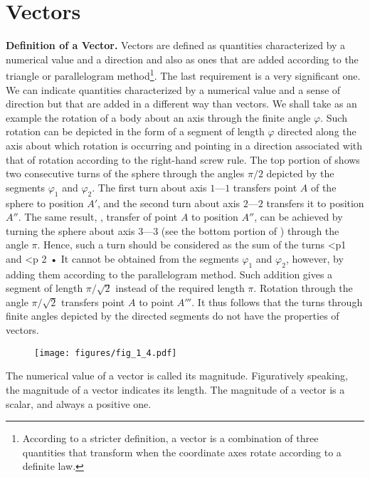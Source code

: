 \section{Vectors}\label{sec:1_2}

\textbf{Definition of a Vector.} Vectors are defined as quantities characterized by a numerical value and a direction and also as ones that are added according to the triangle or parallelogram method\footnote{According to a stricter definition, a vector is a combination of three quantities that transform when the coordinate axes rotate according to a definite law.}. The last requirement is a very significant one. We can indicate quantities characterized by a numerical value and a sense of direction but that are added in a different way than vectors. We shall take as an example the rotation of a body about an axis through the finite angle $\varphi$. Such rotation can be depicted in the form of a segment of length $\varphi$ directed along the axis about which rotation is occurring and pointing in a direction associated with that of rotation according to the right-hand screw rule. The top portion of  shows two consecutive turns of the sphere through the angles $\pi/2$ depicted by the segments $\varphi_1$ and $\varphi_2$. The first turn about axis $1$---$1$ transfers point $A$ of the sphere to position $A'$, and the second turn about axis $2$---$2$ transfers it to position $A''$. The same result, \ie, transfer of point $A$ to position $A''$, can be achieved by turning the sphere about axis $3$---$3$ (see the bottom portion of ) through the angle $\pi$. Hence, such a turn should be considered as the sum of the turns <p1 and <p 2 • It cannot be obtained from the segments $\varphi_1$ and $\varphi_2$, however, by adding them according to the parallelogram method. Such addition gives a segment of length $\pi/\sqrt{2}$ instead of the required length $\pi$. Rotation through the angle $\pi/\sqrt{2}$ transfers point $A$ to point $A'''$. It thus follows that the turns through finite angles depicted by the directed segments do not have the properties of vectors.

\begin{figure}[t]
	\begin{center}
		\texttt{[image: figures/fig\_1\_4.pdf]}
		\caption[]{}
		\label{fig:1_4}
	\end{center}
\vspace{-0.8cm}
\end{figure}

The numerical value of a vector is called its magnitude. Figuratively speaking, the magnitude of a vector indicates its length. The magnitude of a vector is a scalar, and always a positive one.

